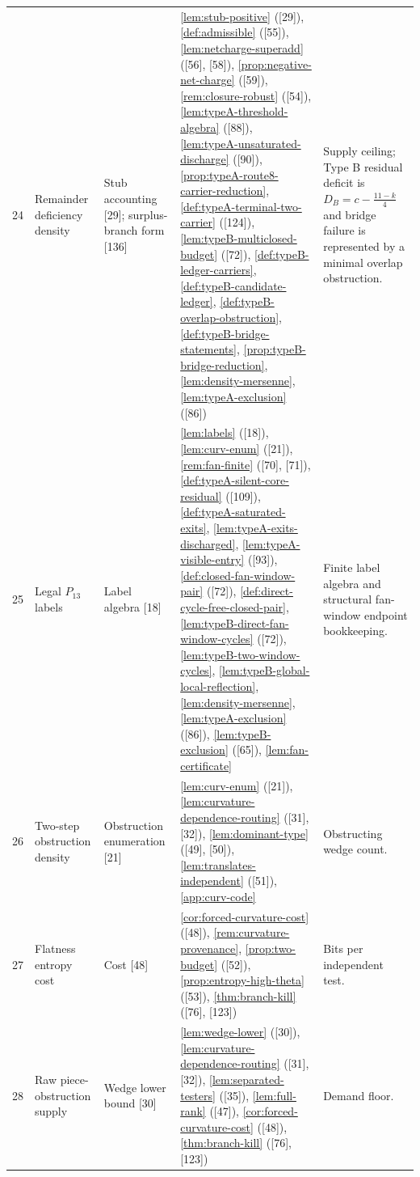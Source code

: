 \documentclass[11pt]{article}
\begin{document}
{\begin{longtable}{C{0.032\textwidth} L{0.145\textwidth} L{0.105\textwidth} L{0.50\textwidth} L{0.155\textwidth}}
24 & Remainder deficiency density & Stub accounting {[29]}; surplus-branch form {[136]} & \cref{lem:stub-positive} ([29]), \cref{def:admissible} ([55]), \cref{lem:netcharge-superadd} ([56], [58]), \cref{prop:negative-net-charge} ([59]), \cref{rem:closure-robust} ([54]), \cref{lem:typeA-threshold-algebra} ([88]), \cref{lem:typeA-unsaturated-discharge} ([90]), \cref{prop:typeA-route8-carrier-reduction}, \cref{def:typeA-terminal-two-carrier} ([124]), \cref{lem:typeB-multiclosed-budget} ([72]), \cref{def:typeB-ledger-carriers}, \cref{def:typeB-candidate-ledger}, \cref{def:typeB-overlap-obstruction}, \cref{def:typeB-bridge-statements}, \cref{prop:typeB-bridge-reduction}, \cref{lem:density-mersenne}, \cref{lem:typeA-exclusion} ([86]) & Supply ceiling; Type B residual deficit is $D_B=c-\frac{11-k}{4}$ and bridge failure is represented by a minimal overlap obstruction. \\
25 & Legal $P_{13}$ labels & Label algebra {[18]} & \cref{lem:labels} ([18]), \cref{lem:curv-enum} ([21]), \cref{rem:fan-finite} ([70], [71]), \cref{def:typeA-silent-core-residual} ([109]), \cref{def:typeA-saturated-exits}, \cref{lem:typeA-exits-discharged}, \cref{lem:typeA-visible-entry} ([93]), \cref{def:closed-fan-window-pair} ([72]), \cref{def:direct-cycle-free-closed-pair}, \cref{lem:typeB-direct-fan-window-cycles} ([72]), \cref{lem:typeB-two-window-cycles}, \cref{lem:typeB-global-local-reflection}, \cref{lem:density-mersenne}, \cref{lem:typeA-exclusion} ([86]), \cref{lem:typeB-exclusion} ([65]), \cref{lem:fan-certificate} & Finite label algebra and structural fan-window endpoint bookkeeping. \\
26 & Two-step obstruction density & Obstruction enumeration {[21]} & \cref{lem:curv-enum} ([21]), \cref{lem:curvature-dependence-routing} ([31], [32]), \cref{lem:dominant-type} ([49], [50]), \cref{lem:translates-independent} ([51]), \cref{app:curv-code} & Obstructing wedge count. \\
27 & Flatness entropy cost & Cost {[48]} & \cref{cor:forced-curvature-cost} ([48]), \cref{rem:curvature-provenance}, \cref{prop:two-budget} ([52]), \cref{prop:entropy-high-theta} ([53]), \cref{thm:branch-kill} ([76], [123]) & Bits per independent test. \\
28 & Raw piece-obstruction supply & Wedge lower bound {[30]} & \cref{lem:wedge-lower} ([30]), \cref{lem:curvature-dependence-routing} ([31], [32]), \cref{lem:separated-testers} ([35]), \cref{lem:full-rank} ([47]), \cref{cor:forced-curvature-cost} ([48]), \cref{thm:branch-kill} ([76], [123]) & Demand floor. \\

\end{longtable}}
\end{document}
